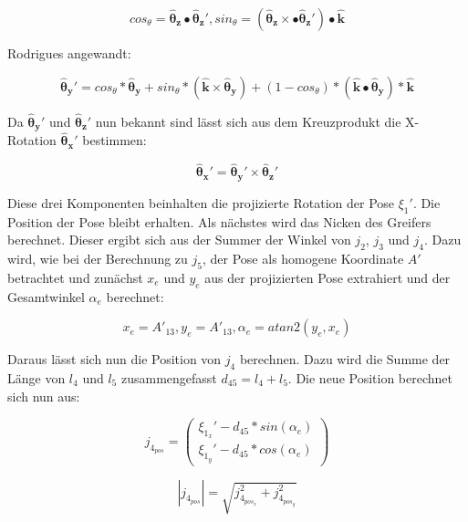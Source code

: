 \begin{equation}
cos_\theta = \pmb{\hat{\theta}_z} \bullet \pmb{\hat{\theta}_z'}, sin_\theta = (\pmb{\hat{\theta}_z} \times \bullet \pmb{\hat{\theta}_z'}) \bullet \pmb{\hat{k}}
\label{eq:24}
\end{equation}

Rodrigues angewandt:

\begin{equation}
\pmb{\hat{\theta}_y'} = cos_\theta * \pmb{\hat{\theta}_y} + sin_\theta * ( \pmb{\hat{k}} \times \pmb{\hat{\theta}_y}) + (1 - cos_\theta) * (\pmb{\hat{k}} \bullet \pmb{\hat{\theta}_y}) * \pmb{\hat{k}} 
\label{eq:25}
\end{equation}

Da $\pmb{\hat{\theta}_y'}$ und $\pmb{\hat{\theta}_z'} $ nun bekannt sind lässt sich aus dem Kreuzprodukt die X-Rotation $\pmb{\hat{\theta}_x'} $ bestimmen:

\begin{equation}
\pmb{\hat{\theta}_x'} = \pmb{\hat{\theta}_y'} \times \pmb{\hat{\theta}_z'}
\label{eq:26}
\end{equation}

Diese drei Komponenten beinhalten die projizierte Rotation der Pose $\xi_1'$. Die Position der Pose bleibt erhalten. Als nächstes wird das Nicken des Greifers berechnet. Dieser ergibt sich aus der Summer der Winkel von $j_2$, $j_3$ und $j_4$. Dazu wird, wie bei der Berechnung zu $j_5$, der Pose als homogene Koordinate $A'$ betrachtet und zunächst $x_{e}$ und $y_{e}$ aus der projizierten Pose extrahiert und der Gesamtwinkel $\alpha_{e}$ berechnet:

\begin{equation}
x_{e} = A'_{13}, y_{e} = A'_{13}, \alpha_{e} = atan2(y_{e}, x_{e})
\label{eq:28}
\end{equation}

Daraus lässt sich nun die Position von $j_4$ berechnen. Dazu wird die Summe der Länge von $l_4$ und $l_5$ zusammengefasst $d_{45} = l_4 + l_5$. Die neue Position berechnet sich nun aus:

\begin{equation}
j_{4_{pos}} = 
\left(\begin{array}{c} 
\xi_{1_x}' - d_{45} * sin(\alpha_{e})\\
\xi_{1_y}' - d_{45} * cos(\alpha_{e})
\end{array}\right)
\label{eq:29}
\end{equation}

\begin{equation}
|j_{4_{pos}}| = \sqrt{j_{4_{pos_x}}^2 + j_{4_{pos_y}}^2}
\label{eq:31}
\end{equation}

